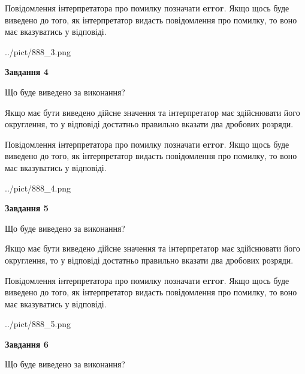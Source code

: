 \documentclass[12pt, ukrainian]{article}
\begin{document}
{\begin {Large}
Повідомлення інтерпретатора про помилку позначати \textbf{error}.
Якщо щось буде виведено до того, як інтерпретатор видасть повідомлення про помилку, 
то воно має вказуватись у відповіді. \par

\begin{center}
	{../pict/888_3.png}
\end{center}
\newpage

{\begin {center}\textbf{Завдання 4}\end {center}}\par
Що буде виведено за виконання? \par

Якщо має бути виведено дійсне значення та інтерпретатор має здійснювати його округлення, 
то у відповіді достатньо правильно вказати два дробових розряди.

Повідомлення інтерпретатора про помилку позначати \textbf{error}.
Якщо щось буде виведено до того, як інтерпретатор видасть повідомлення про помилку, 
то воно має вказуватись у відповіді. \par

\begin{center}
	{../pict/888_4.png}
\end{center}
\newpage

{\begin {center}\textbf{Завдання 5}\end {center}}\par
Що буде виведено за виконання? \par

Якщо має бути виведено дійсне значення та інтерпретатор має здійснювати його округлення, 
то у відповіді достатньо правильно вказати два дробових розряди.

Повідомлення інтерпретатора про помилку позначати \textbf{error}.
Якщо щось буде виведено до того, як інтерпретатор видасть повідомлення про помилку, 
то воно має вказуватись у відповіді. \par

\begin{center}
	{../pict/888_5.png}
\end{center}
\newpage

{\begin {center}\textbf{Завдання 6}\end {center}}\par
Що буде виведено за виконання? \par


\end{Large}}
\end{document}
